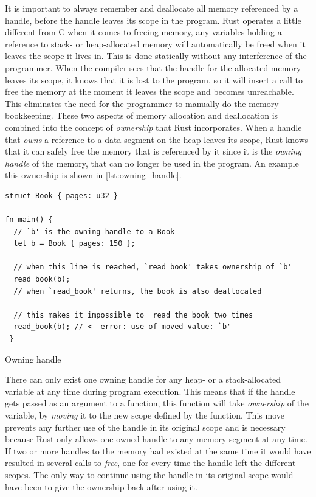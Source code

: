 
It is important to always remember and deallocate all memory referenced by a handle, before the handle leaves its scope in the program.
Rust operates a little different from C when it comes to freeing memory, any variables holding a reference to stack- or heap-allocated memory will automatically be freed when it leaves the scope it lives in.
This is done statically without any interference of the programmer.
When the compiler sees that the handle for the allocated memory leaves its scope, it knows that it is lost to the program, so it will insert a call to free the memory at the moment it leaves the scope and becomes unreachable.
This eliminates the need for the programmer to manually do the memory bookkeeping.
These two aspects of memory allocation and deallocation is combined into the concept of \emph{ownership} that Rust incorporates.
When a handle that \emph{owns} a reference to a data-segment on the heap leaves its scope, Rust knows that it can safely free the memory that is referenced by it since it is the \emph{owning handle} of the memory, that can no longer be used in the program.
An example this ownership is shown in \autoref{lst:owning_handle}.

\begin{listing}[tb]
\begin{verbatim}
struct Book { pages: u32 }

fn main() {
  // `b' is the owning handle to a Book
  let b = Book { pages: 150 };

  // when this line is reached, `read_book' takes ownership of `b'
  read_book(b);
  // when `read_book' returns, the book is also deallocated

  // this makes it impossible to  read the book two times
  read_book(b); // <- error: use of moved value: `b'
 }
\end{verbatim}
\caption{Owning handle}
\label{lst:owning_handle}
\end{listing}

There can only exist one owning handle for any heap- or a stack-allocated variable at any time during program execution.
This means that if the handle gets passed as an argument to a function, this function will take \emph{ownership} of the variable, by \emph{moving} it to the new scope defined by the function.
This move prevents any further use of the handle in its original scope and is necessary because Rust only allows one owned handle to any memory-segment at any time.
If two or more handles to the memory had existed at the same time it would have resulted in several calls to \emph{free}, one for every time the handle left the different scopes.
The only way to continue using the handle in its original scope would have been to give the ownership back after using it.

